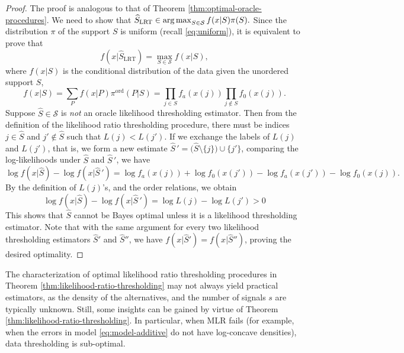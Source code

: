 \begin{proof}%
The proof is analogous to that of Theorem \ref{thm:optimal-oracle-procedures}.
We need to show that
$
\widehat{S}_{\rm LRT} \in \operatorname*{arg\,max}_{S \in \mathcal{S}} f(x|S) \pi(S).
$
Since the distribution $\pi$ of the support $S$ 
is uniform (recall \eqref{eq:uniform}), it is equivalent to prove that 
$$
f(x|\widehat{S}_{\text{LRT}}) = \max_{S \in \mathcal {S}} f(x|S),
$$ 
where  $f(x|S)$ is the conditional distribution of the data given the unordered support $S$,
\begin{equation} \label{eq:likelihood-ratio-thresholding-proof}
    f(x|S) = \sum_P f(x|P) \pi^{\text{ord}}(P|S) = \prod_{j\in S} f_a(x(j)) \prod_{j\not\in S}{f_0(x(j))}.
\end{equation}
Suppose $\widehat S\in {\mathcal S}$ is {\em not} an oracle likelihood thresholding estimator. 
Then from the definition of the likelihood ratio thresholding procedure, there 
must be indices 
$j \in \widehat S$ and $j' \not \in \widehat{S}$ such that $L(j) < L(j')$.
If we exchange the labels of $L(j)$ and $L(j')$, that is, we form a new estimate 
$\widehat{S}\,' = \big(\widehat{S}\setminus\{j\}\big)\cup\{j'\}$,
comparing the log-likelihoods under $\widehat{S}$ and $\widehat{S}\,'$, we have
\begin{equation*}
    \log{f(x|\widehat{S})} - \log{f(x|\widehat{S}\,')} 
    = \log{f_a(x(j))} + \log{f_0(x(j'))} - \log{f_a(x(j'))} - \log{f_0(x(j))}.
\end{equation*}
By the definition of $L(j)$'s, and the order relations, we obtain
\begin{equation*}
    \log{f(x|\widehat{S})} - \log{f(x|\widehat{S}\,')} 
    = \log{L(j)} - \log{L(j')} > 0
\end{equation*}
This shows that $\widehat S$ cannot be Bayes optimal unless it is a likelihood thresholding estimator.
Note that with the same argument for every two likelihood thresholding estimators $\widehat S'$
and $\widehat S''$, we have $ f(x|\widehat{S}') = f(x|\widehat{S}'')$, proving the desired optimality.
\end{proof}


The characterization of optimal likelihood ratio thresholding procedures in Theorem \ref{thm:likelihood-ratio-thresholding} may not always yield practical estimators, as the density of the alternatives, and the number of signals $s$ 
are typically unknown. Still, some insights can be gained by virtue of Theorem \ref{thm:likelihood-ratio-thresholding}.
In particular, when MLR fails (for example, when the errors in model \eqref{eq:model-additive} do not have log-concave densities), 
data thresholding is sub-optimal. 


